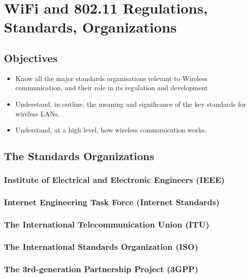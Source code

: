 \chapter{WiFi and 802.11 Regulations, Standards, Organizations}\label{wifi}

\minitoc 


\section*{Objectives}
\begin{itemize}

\item Know all the major standards organisations relevant to Wireless communication, and
	their role in its regulation and development

\item Understand, in outline, the meaning and significance of the key standards
	for wireless LANs.

\item Understand, at a high level, how wireless communication works.

\end{itemize}

\section{The Standards Organizations}

\subsection{Institute of Electrical and Electronic Engineers (IEEE)}

\subsection{Internet Engineering Task Force (Internet Standards)}

\subsection{The International Telecommunication Union (ITU)}

\subsection{The International Standards Organization (ISO)}

\subsection{The 3rd-generation Partnership Project (3GPP)}

